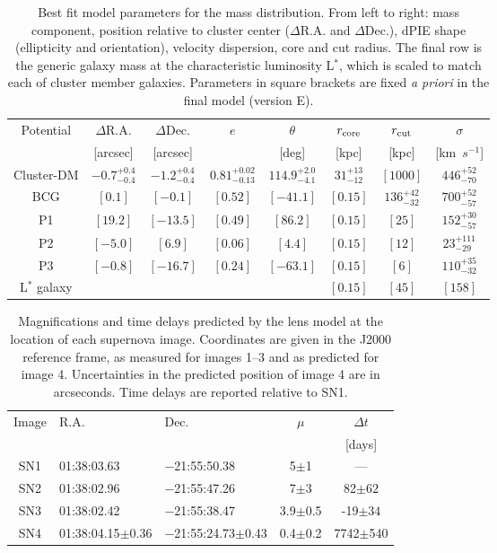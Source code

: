 \documentclass[12pt]{article}
\begin{document}
\begin{table}[ht]
    \centering
    \begin{tabular}{c|c|c|c|c|c|c|c|}
    Potential & $\Delta$R.A. & $\Delta$Dec. & $e$ & $\theta$ & $r_{\rm core}$ & $r_{\rm cut}$ & $\sigma$ \\
                  & [arcsec] & [arcsec] & & [deg] & [kpc] & [kpc] & [km\ $s^{-1}$] \\
\midrule
Cluster-DM & $ -0.7^{+0.4}_{-0.4}$ & $ -1.2^{+0.4}_{-0.4}$ & $ 0.81^{+0.02}_{-0.13}$ & $114.9^{+2.0}_{-4.1}$ & $31^{+13}_{-12}$ & $[1000]$ & $446^{+52}_{-70}$ \\
BCG            & $[  0.1]$ & $[ -0.1]$ & $[0.52]$ & $[-41.1]$ & $[0.15]$ & $136^{+42}_{-32}$  & $700^{+52}_{-57}$ \\
P1             & $[ 19.2]$ & $[-13.5]$ & $[0.49]$ & $[ 86.2]$ & $[0.15]$ & $[25]$            &  $152^{+30}_{-57}$ \\
P2             & $[ -5.0]$ & $[  6.9]$ & $[0.06]$ & $[  4.4]$ & $[0.15]$ & $[12]$            &  $23^{+111}_{-29}$ \\
P3             & $[ -0.8]$ & $[-16.7]$ & $[0.24]$ & $[-63.1]$ & $[0.15]$ & $[6]$             &  $110^{+35}_{-32}$ \\
L$^{*}$ galaxy &           &           &          &           & $[0.15]$ & $[45]$            & $[158]$\\
    \end{tabular}
    \caption{Best fit model parameters for the mass distribution. From left to right: mass component, position relative to cluster center ($\Delta$R.A. and $\Delta$Dec.), dPIE shape (ellipticity and orientation), velocity dispersion, core and cut radius. The final row  is the generic galaxy mass at the characteristic luminosity L$^*$, which is scaled to match each of cluster member galaxies.  Parameters in square brackets are fixed {\it a priori} in the final model (version E). }
    \label{tab:massmodel}
\end{table}


\begin{table}[tb]
    \centering
    \begin{tabular}{c|l|l|c|c|}
    Image     & R.A. & Dec. & $\mu$ & $\Delta t$ \\
    & & & & [days] \\
\hline 
SN1 & 01:38:03.63     & $-$21:55:50.38         & 5$\pm$1     &  ---\\
SN2 & 01:38:02.96     & $-$21:55:47.26         & 7$\pm$3     & 82$\pm62$ \\
SN3 & 01:38:02.42     & $-$21:55:38.47         & 3.9$\pm$0.5   &   -19$\pm34$ \\
SN4 & 01:38:04.15$\pm$0.36 & $-$21:55:24.73$\pm$0.43 & 0.4$\pm$0.2 & 7742$\pm$540\\
\hline 
\end{tabular}
    \caption{Magnifications and time delays predicted by the lens model at the location of each supernova image. Coordinates are given in the J2000 reference frame, as measured for images 1--3 and as predicted for image 4.  Uncertainties in the predicted position of image 4 are in arcseconds.  Time delays are reported relative to SN1.}
    \label{tab:snpred}
\end{table}
\end{document}
